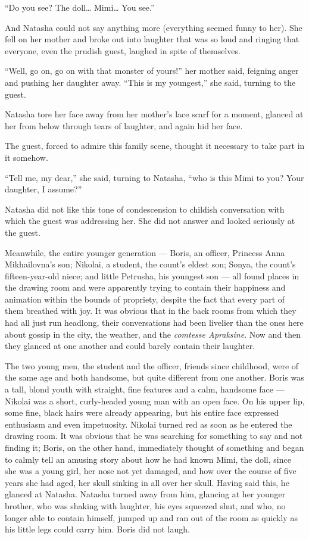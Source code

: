 ``Do you see? The doll\ldots{} Mimi\ldots{} You see.'' %

And Natasha could not say anything more (everything seemed funny to her). She fell on her mother and broke out into laughter that was so loud and ringing that everyone, even the prudish guest, laughed in spite of themselves.

``Well, go on, go on with that monster of yours!'' her mother said, feigning anger and pushing her daughter away. ``This is my youngest,'' she said, turning to the guest. %

Natasha tore her face away from her mother's lace scarf for a moment, glanced at her from below through tears of laughter, and again hid her face.

The guest, forced to admire this family scene, thought it necessary to take part in it somehow.

``Tell me, my dear,'' she said, turning to Natasha, ``who is this Mimi to you? Your daughter, I assume?''

Natasha did not like this tone of condescension to childish conversation with which the guest was addressing her. She did not answer and looked seriously at the guest.

Meanwhile, the entire younger generation --- Boris, an officer, Princess Anna Mikhailovna's son; Nikolai, a student, the count's eldest son; Sonya, the count's fifteen-year-old niece; and little Petrusha, his youngest son --- all found places in the drawing room and were apparently trying to contain their happiness and animation within the bounds of propriety, despite the fact that every part of them breathed with joy. It was obvious that in the back rooms from which they had all just run headlong, their conversations had been livelier than the ones here about gossip in the city, the weather, and the \textit{comtesse Apraksine}. Now and then they glanced at one another and could barely contain their laughter.

The two young men, the student and the officer, friends since childhood, were of the same age and both handsome, but quite different from one another. Boris was a tall, blond youth with straight, fine features and a calm, handsome face --- Nikolai was a short, curly-headed young man with an open face. On his upper lip, some fine, black hairs were already appearing, but his entire face expressed enthusiasm and even impetuosity. Nikolai turned red as soon as he entered the drawing room. It was obvious that he was searching for something to say and not finding it; Boris, on the other hand, immediately thought of something and began to calmly tell an amusing story about how he had known Mimi, the doll, since she was a young girl, her nose not yet damaged, and how over the course of five years she had aged, her skull sinking in all over her skull. Having said this, he glanced at Natasha. Natasha turned away from him, glancing at her younger brother, who was shaking with laughter, his eyes squeezed shut, and who, no longer able to contain himself, jumped up and ran out of the room as quickly as his little legs could carry him. Boris did not laugh.

